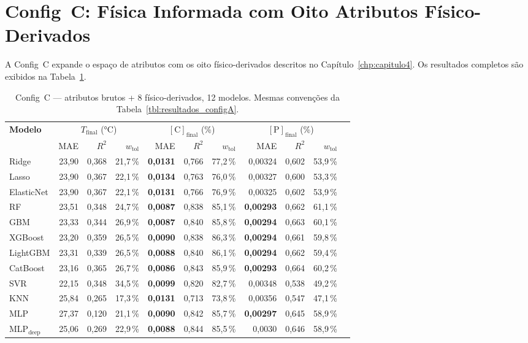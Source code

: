 \section{Config~C: Física Informada com Oito Atributos Físico-Derivados}
\label{sec:resultados-C}

A Config~C expande o espaço de atributos com os oito físico-derivados descritos no Capítulo~\ref{chp:capitulo4}. Os resultados completos são exibidos na Tabela~\ref{tbl:resultados_configC}.

\begin{table}[H]
\caption{Config~C --- atributos brutos + 8 físico-derivados, 12 modelos. Mesmas convenções da Tabela~\ref{tbl:resultados_configA}.}
\label{tbl:resultados_configC}
\centering
\footnotesize
\setlength{\tabcolsep}{4pt}
\begin{tabular}{lrrrrrrrrrr}
\hline
\textbf{Modelo} &
  \multicolumn{3}{c}{$T_\text{final}$ (°C)} &
  \multicolumn{3}{c}{$[\text{C}]_\text{final}$ (\%)} &
  \multicolumn{3}{c}{$[\text{P}]_\text{final}$ (\%)} \\
\cline{2-4}\cline{5-7}\cline{8-10}
 & MAE & $R^2$ & $w_\text{tol}$ & MAE & $R^2$ & $w_\text{tol}$ & MAE & $R^2$ & $w_\text{tol}$ \\
\hline
Ridge          & 23,90 & 0,368 & 21,7\,\% & \textbf{0,0131} & 0,766 & 77,2\,\% & 0,00324 & 0,602 & 53,9\,\% \\
Lasso          & 23,90 & 0,367 & 22,1\,\% & \textbf{0,0134} & 0,763 & 76,0\,\% & 0,00327 & 0,600 & 53,3\,\% \\
ElasticNet     & 23,90 & 0,367 & 22,1\,\% & \textbf{0,0131} & 0,766 & 76,9\,\% & 0,00325 & 0,602 & 53,9\,\% \\
RF             & 23,51 & 0,348 & 24,7\,\% & \textbf{0,0087} & 0,838 & 85,1\,\% & \textbf{0,00293} & 0,662 & 61,1\,\% \\
GBM            & 23,33 & 0,344 & 26,9\,\% & \textbf{0,0087} & 0,840 & 85,8\,\% & \textbf{0,00294} & 0,663 & 60,1\,\% \\
XGBoost        & 23,20 & 0,359 & 26,5\,\% & \textbf{0,0090} & 0,838 & 86,3\,\% & \textbf{0,00294} & 0,661 & 59,8\,\% \\
LightGBM       & 23,31 & 0,339 & 26,5\,\% & \textbf{0,0088} & 0,840 & 86,1\,\% & \textbf{0,00294} & 0,662 & 59,4\,\% \\
CatBoost       & 23,16 & 0,365 & 26,7\,\% & \textbf{0,0086} & 0,843 & 85,9\,\% & \textbf{0,00293} & 0,664 & 60,2\,\% \\
SVR            & 22,15 & 0,348 & 34,5\,\% & \textbf{0,0099} & 0,820 & 82,7\,\% & 0,00348 & 0,538 & 49,2\,\% \\
KNN            & 25,84 & 0,265 & 17,3\,\% & \textbf{0,0131} & 0,713 & 73,8\,\% & 0,00356 & 0,547 & 47,1\,\% \\
MLP            & 27,37 & 0,120 & 21,1\,\% & \textbf{0,0090} & 0,842 & 85,7\,\% & \textbf{0,00297} & 0,645 & 58,9\,\% \\
MLP$_\text{deep}$ & 25,06 & 0,269 & 22,9\,\% & \textbf{0,0088} & 0,844 & 85,5\,\% & 0,0030 & 0,646 & 58,9\,\% \\
\hline
\end{tabular}
\end{table}

